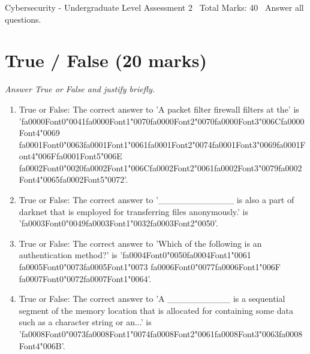 \documentclass[12pt]{article}
\begin{document}
\begin{center}
Cybersecurity - Undergraduate Level Assessment 2 \
Total Marks: 40 \
Answer all questions.
\end{center}

\section*{True / False (20 marks)}
\textit{Answer True or False and justify briefly.}
\begin{enumerate}[label=\arabic*.]
\item True or False: The correct answer to 'A packet filter firewall filters at the' is '{\csname fa0000Font0\endcsname\char"0041}{\csname fa0000Font1\endcsname\char"0070}{\csname fa0000Font2\endcsname\char"0070}{\csname fa0000Font3\endcsname\char"006C}{\csname fa0000Font4\endcsname\char"0069} {\csname fa0001Font0\endcsname\char"0063}{\csname fa0001Font1\endcsname\char"0061}{\csname fa0001Font2\endcsname\char"0074}{\csname fa0001Font3\endcsname\char"0069}{\csname fa0001Font4\endcsname\char"006F}{\csname fa0001Font5\endcsname\char"006E} {\csname fa0002Font0\endcsname\char"0020}{\csname fa0002Font1\endcsname\char"006C}{\csname fa0002Font2\endcsname\char"0061}{\csname fa0002Font3\endcsname\char"0079}{\csname fa0002Font4\endcsname\char"0065}{\csname fa0002Font5\endcsname\char"0072}'.
\item True or False: The correct answer to '\_\_\_\_\_\_\_\_\_\_\_\_ is also a part of darknet that is employed for transferring files anonymously.' is '{\csname fa0003Font0\endcsname\char"0049}{\csname fa0003Font1\endcsname\char"0032}{\csname fa0003Font2\endcsname\char"0050}'.
\item True or False: The correct answer to 'Which of the following is an authentication method?' is '{\csname fa0004Font0\endcsname\char"0050}{\csname fa0004Font1\endcsname\char"0061} {\csname fa0005Font0\endcsname\char"0073}{\csname fa0005Font1\endcsname\char"0073} {\csname fa0006Font0\endcsname\char"0077}{\csname fa0006Font1\endcsname\char"006F} {\csname fa0007Font0\endcsname\char"0072}{\csname fa0007Font1\endcsname\char"0064}'.
\item True or False: The correct answer to 'A \_\_\_\_\_\_\_\_\_\_ is a sequential segment of the memory location that is allocated for containing some data such as a character string or an...' is '{\csname fa0008Font0\endcsname\char"0073}{\csname fa0008Font1\endcsname\char"0074}{\csname fa0008Font2\endcsname\char"0061}{\csname fa0008Font3\endcsname\char"0063}{\csname fa0008Font4\endcsname\char"006B}'.

\end{enumerate}
\end{document}
